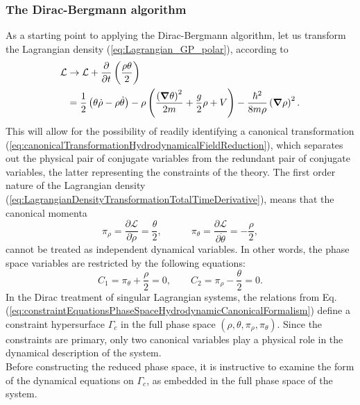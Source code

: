 \documentclass[twocolumn, nofootinbib, nobibnotes, amsmath,amssymb,aps, pra, floatfix]{revtex4-1}
\newcommand{\gv}[1]{\ensuremath{\mbox{\boldmath$ #1 $}}} %
\newcommand{\pd}[2]{\frac{\partial #1}{\partial #2}} %
\newcommand{\grad}[1]{\gv{\nabla} #1} %
\begin{document}
\subsubsection{\label{sec:GPfieldHydrodynamicCanonicalFormalismDBmethod}The Dirac-Bergmann algorithm}
As a starting point to applying the Dirac-Bergmann algorithm, let us transform the Lagrangian density (\ref{eq:Lagrangian_GP_polar}), according to
\begin{align}
  \mathcal{L}&\rightarrow\mathcal{L}+\pd{}{t}\left( \frac{\rho\theta}{2} \right) \label{eq:LagrangianDensityTransformationTotalTimeDerivative} \\
  &=\frac{1}{2}\left( \theta\dot{\rho}-\rho\dot{\theta} \right)-\rho\left( \frac{\left( \grad{\theta} \right)^2}{2m}+\frac{g}{2}\rho+V \right)-\frac{\hbar^2}{8m\rho}\left( \grad{\rho} \right)^2\nonumber.
\end{align}
This will allow for the possibility of readily identifying a canonical transformation (\ref{eq:canonicalTransformationHydrodynamicalFieldReduction}), which separates out the physical pair of conjugate variables from the redundant pair of conjugate variables, the latter representing the constraints of the theory.
The first order nature of the Lagrangian density (\ref{eq:LagrangianDensityTransformationTotalTimeDerivative}), means that the canonical momenta
\begin{equation}
  \pi_{\rho}=\pd{\mathcal{L}}{\dot{\rho}}=\frac{\theta}{2},\quad\quad\quad\pi_{\theta}=\pd{\mathcal{L}}{\dot{\theta}}=-\frac{\rho}{2},
  \label{eq:conjugate_momenta_2}
\end{equation}
cannot be treated as independent dynamical variables.
In other words, the phase space variables are restricted by the following equations:
\begin{equation}
  C_1=\pi_{\theta}+\frac{\rho}{2}=0, \quad\quad C_2=\pi_{\rho}-\frac{\theta}{2}=0.
  \label{eq:constraintEquationsPhaseSpaceHydrodynamicCanonicalFormalism}
\end{equation}
In the Dirac treatment \cite{dirac1958generalized,dirac2001lectures} of singular Lagrangian systems, the relations from Eq. (\ref{eq:constraintEquationsPhaseSpaceHydrodynamicCanonicalFormalism}) define a constraint hypersurface $\Gamma_c$ in the full phase space $\left( \rho,\theta,\pi_{\rho},\pi_{\theta} \right)$.
Since the constraints are primary, only two canonical variables play a physical role in the dynamical description of the system.\\
Before constructing the reduced phase space, it is instructive to examine the form of the dynamical equations on $\Gamma_c$, as embedded in the full phase space of the system.
\end{document}
